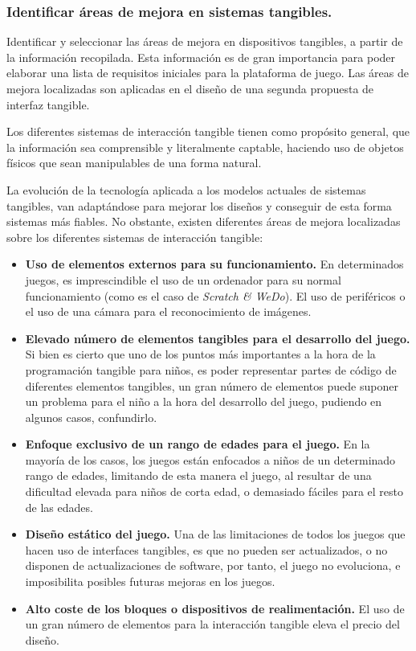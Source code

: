 \subsubsection{Identificar áreas de mejora en sistemas tangibles.}

Identificar y seleccionar las áreas de mejora en dispositivos tangibles, a partir de la información recopilada. Esta información es de gran importancia para poder elaborar una lista de requisitos iniciales para la plataforma de juego.
Las áreas de mejora localizadas son aplicadas en el diseño de una segunda propuesta de interfaz tangible.

Los diferentes sistemas de interacción tangible tienen como propósito general, que la información
sea comprensible y literalmente captable, haciendo uso de objetos físicos que sean
manipulables de una forma natural.

La evolución de la tecnología aplicada a los modelos actuales de sistemas tangibles, van
adaptándose para mejorar los diseños y conseguir de esta forma sistemas más fiables. No
obstante, existen diferentes áreas de mejora localizadas sobre los diferentes sistemas de interacción
tangible:

\begin{itemize}

\item \textbf{Uso de elementos externos para su funcionamiento.} En determinados juegos, es imprescindible
el uso de un ordenador para su normal funcionamiento (como es el caso de \emph{Scratch
\& WeDo}). El uso de periféricos o el uso de una cámara para el reconocimiento de imágenes.

\item \textbf{Elevado número de elementos tangibles para el desarrollo del juego.} Si bien es cierto
que uno de los puntos más importantes a la hora de la programación tangible para niños, es
poder representar partes de código de diferentes elementos tangibles, un gran número
de elementos puede suponer un problema para el niño a la hora del desarrollo del
juego, pudiendo en algunos casos, confundirlo.

\item \textbf{Enfoque exclusivo de un rango de edades para el juego.} En la mayoría de los casos, los
juegos están enfocados a niños de un determinado rango de edades, limitando de esta
manera el juego, al resultar de una dificultad elevada para niños de corta edad, o demasiado fáciles para el resto de las edades.

\item \textbf{Diseño estático del juego.} Una de las limitaciones de todos los juegos que hacen uso
de interfaces tangibles, es que no pueden ser actualizados, o no disponen de actualizaciones
de software, por tanto, el juego no evoluciona, e imposibilita posibles futuras mejoras en los juegos.

\item \textbf{Alto coste de los bloques o dispositivos de realimentación.} El uso de un gran número
de elementos para la interacción tangible eleva el precio del diseño.

\end{itemize}

